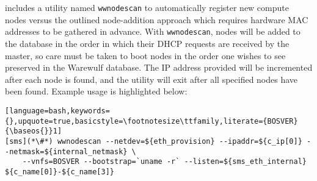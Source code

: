 \begin{center}
\begin{tcolorbox}[]
\small \Warewulf{} includes a utility named \texttt{wwnodescan}
to automatically register new compute nodes versus the outlined node-addition approach
which requires hardware MAC addresses to be gathered in advance.  With
\texttt{wwnodescan}, nodes will be added to the \Warewulf{} database in the
order in which their DHCP requests are received by the master, so care must be
taken to boot nodes in the order one wishes to see preserved in the Warewulf
database. The IP address provided will be incremented after each node is found,
and the utility will exit after all specified nodes have been found. Example
usage is highlighted below:
\begin{lstlisting}[language=bash,keywords={},upquote=true,basicstyle=\footnotesize\ttfamily,literate={BOSVER}{\baseos{}}1]
[sms](*\#*) wwnodescan --netdev=${eth_provision} --ipaddr=${c_ip[0]} --netmask=${internal_netmask} \
    --vnfs=BOSVER --bootstrap=`uname -r` --listen=${sms_eth_internal} ${c_name[0]}-${c_name[3]}
\end{lstlisting}
\end{tcolorbox}
\end{center}
